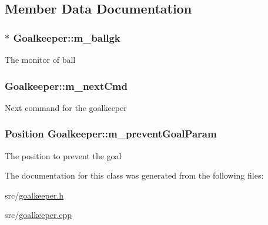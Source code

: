 \subsection{Member Data Documentation}
\hypertarget{classGoalkeeper_a8fc8e75ffc8d3582d293b0fe42a0c073}{
\subsubsection[{m\_\-ballgk}]{$\ast$ {\bf Goalkeeper::m\_\-ballgk}}}
\label{classGoalkeeper_a8fc8e75ffc8d3582d293b0fe42a0c073}
The monitor of ball \hypertarget{classGoalkeeper_a84e9e9f514d0ace81c95e03ee832aea8}{
\subsubsection[{m\_\-nextCmd}]{ {\bf Goalkeeper::m\_\-nextCmd}}}
\label{classGoalkeeper_a84e9e9f514d0ace81c95e03ee832aea8}
Next command for the goalkeeper \hypertarget{classGoalkeeper_a04b3ca2b51698e36928ccce7569842eb}{
\subsubsection[{m\_\-preventGoalParam}]{\setlength{\rightskip}{0pt plus 5cm}Position {\bf Goalkeeper::m\_\-preventGoalParam}}}
\label{classGoalkeeper_a04b3ca2b51698e36928ccce7569842eb}
The position to prevent the goal 

The documentation for this class was generated from the following files:\begin{DoxyCompactItemize}
\item 
src/\hyperlink{goalkeeper_8h}{goalkeeper.h}\item 
src/\hyperlink{goalkeeper_8cpp}{goalkeeper.cpp}\end{DoxyCompactItemize}

